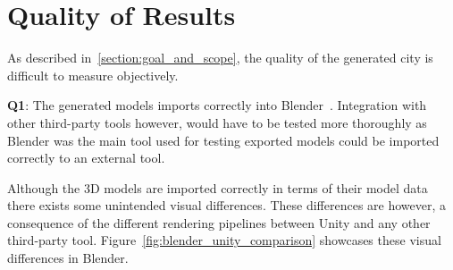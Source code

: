 \section{Quality of Results}

As described in~\ref{section:goal_and_scope}, the quality of the generated city is difficult to measure objectively.

\textbf{Q1}:
The generated models imports correctly into Blender~\cite{blender}.
Integration with other third-party tools however, would have to be tested more thoroughly as Blender was the main tool used for testing exported models could be imported correctly to an external tool. 

Although the 3D models are imported correctly in terms of their model data there exists some unintended visual differences.
These differences are however, a consequence of the different rendering pipelines between Unity and any other third-party tool.
Figure~\ref{fig:blender_unity_comparison} showcases these visual differences in Blender.


